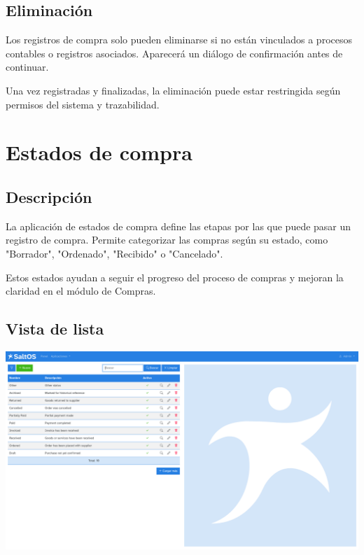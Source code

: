 \documentclass[a4paper]{article}
\begin{document}
\hypertarget{toc120}{}
\subsection{Eliminación}

Los registros de compra solo pueden eliminarse si no están vinculados a procesos contables o registros asociados.
Aparecerá un diálogo de confirmación antes de continuar.

Una vez registradas y finalizadas, la eliminación puede estar restringida según permisos del sistema y trazabilidad.


\hypertarget{toc121}{}
\section{Estados de compra}

\hypertarget{toc122}{}
\subsection{Descripción}

La aplicación de estados de compra define las etapas por las que puede pasar un registro de compra.
Permite categorizar las compras según su estado, como "Borrador", "Ordenado", "Recibido" o "Cancelado".

Estos estados ayudan a seguir el progreso del proceso de compras y mejoran la claridad en el módulo de Compras.

\hypertarget{toc123}{}
\subsection{Vista de lista}

\begin{center}\includegraphics[width=1\textwidth]{../ujest/snaps/test-screenshots-js-screenshots-purchases-purchase-status-list-es-es-1-snap.png}\end{center}
\end{document}
